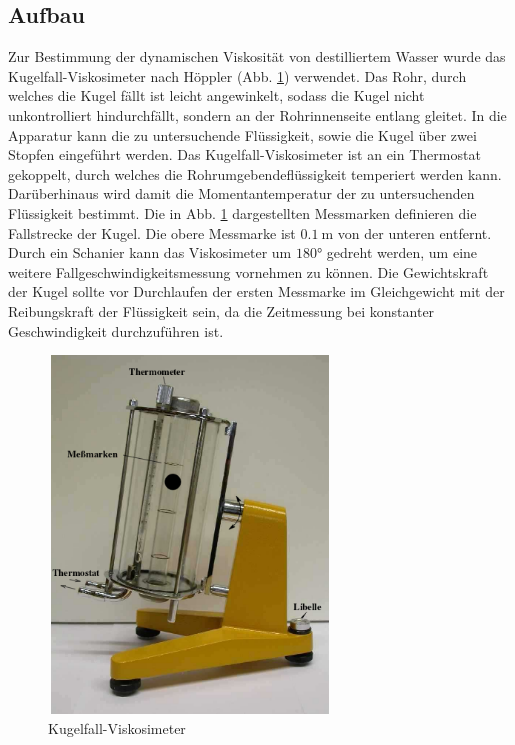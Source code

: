 \subsection{Aufbau}

Zur Bestimmung der dynamischen Viskosität von destilliertem Wasser wurde das Kugelfall-Viskosimeter nach Höppler (Abb. \ref{fig:Aufbau}) verwendet.
Das Rohr, durch welches die Kugel fällt ist leicht angewinkelt, sodass die Kugel nicht unkontrolliert hindurchfällt, sondern an der Rohrinnenseite
entlang gleitet.
In die Apparatur kann die zu untersuchende Flüssigkeit, sowie die Kugel über zwei Stopfen eingeführt werden. Das Kugelfall-Viskosimeter ist an ein Thermostat
gekoppelt, durch welches die Rohrumgebendeflüssigkeit temperiert werden kann. Darüberhinaus wird damit die Momentantemperatur der zu untersuchenden
Flüssigkeit bestimmt. Die in Abb. \ref{fig:Aufbau} dargestellten Messmarken definieren die Fallstrecke der Kugel. Die obere Messmarke ist
$\SI{0,1}{\meter}$ von der unteren entfernt.
Durch ein Schanier kann das Viskosimeter um $\ang{180}$ gedreht werden, um eine weitere Fallgeschwindigkeitsmessung vornehmen zu können.
Die Gewichtskraft der Kugel sollte vor Durchlaufen der ersten Messmarke im Gleichgewicht mit der Reibungskraft der Flüssigkeit sein, da die Zeitmessung
bei konstanter Geschwindigkeit durchzuführen ist.

\begin{figure}
  \centering
  \includegraphics[width=7.50cm, height=9.50cm]{V207_Kugelfall-Viskosimeter_Hoeppler.png}
  \caption{Kugelfall-Viskosimeter\cite{anleitung01}}
  \label{fig:Aufbau}
\end{figure}



\newpage

\nocite{*}
\printbibliography

